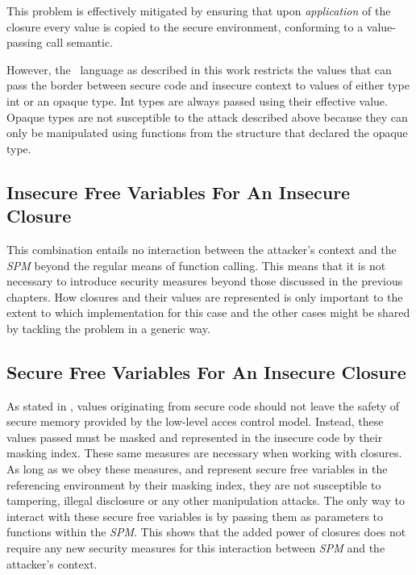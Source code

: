 This problem is effectively mitigated by ensuring that upon \emph{application} of the closure every value is copied to the secure environment, conforming to a value-passing call semantic.

However, the \MiniML\ language as described in this work restricts the values that can pass the border between secure code and insecure context to values of either type int or an opaque  type.
Int types are always passed using their effective value.
Opaque types are not susceptible to the attack described above because they can only be manipulated using functions from the structure that declared the opaque type.




\subsection{Insecure Free Variables For An Insecure Closure}

This combination entails no interaction between the attacker's context and the \emph{SPM} beyond the regular means of function calling.
This means that it is not necessary to introduce security measures beyond those discussed in the previous chapters.
How closures and their values are represented is only important to the extent to which implementation for this case and the other cases might be shared by tackling the problem in a generic way.

\subsection{Secure Free Variables For An Insecure Closure}

As stated in , values originating from secure code should not leave the safety of secure memory provided by the low-level acces control model.
Instead, these values passed must be masked and represented in the insecure code by their masking index.
These same measures are necessary when working with closures.
As long as we obey these measures, and represent secure free variables in the referencing environment by their masking index, they are not susceptible to tampering, illegal disclosure or any other manipulation attacks.
The only way to interact with these secure free variables is by passing them as parameters to functions within the \emph{SPM}.
This shows that the added power of closures does not require any new security measures for this interaction between \emph{SPM} and the attacker's context.

